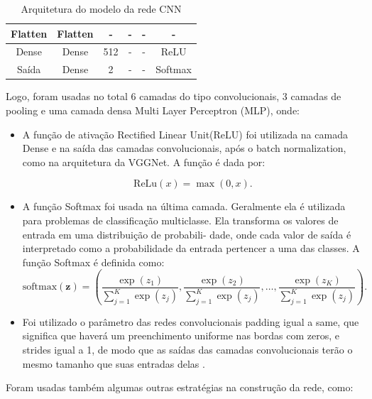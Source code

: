 \documentclass[]{abntex2}
\begin{document}
\begin{table}[H]
\begin{tabular}{|c|c|c|c|c|c|}
    \cellcolor[HTML]{C0C0C0}Flatten                          & Flatten       & -                    & -                 & -       & -           \\ \hline
    \cellcolor[HTML]{C0C0C0}Dense                            & Dense         & 512                  & -                 & -       & ReLU        \\ \hline
    \cellcolor[HTML]{C0C0C0}Saída                            & Dense         & 2                    & -                 & -       & Softmax     \\ \hline
    \end{tabular}
    \caption{Arquitetura do modelo da rede CNN}
    \label{tab:arquiCNN}

\end{table}

Logo, foram usadas no total 6 camadas do tipo convolucionais, 3 camadas de pooling e uma camada densa Multi Layer Perceptron (MLP), onde:

\begin{itemize}
    \item A função de ativação Rectified Linear Unit(ReLU) foi utilizada na camada Dense e na saída das camadas convolucionais, após o batch normalization, como na arquitetura da VGGNet. A função é dada por:
    
    \[
    \text{ReLu}(x) = \max(0, x).
    \]

    \item A função Softmax foi usada na última camada. Geralmente ela é utilizada para problemas de
    classificação multiclasse. Ela transforma os valores de entrada em uma distribuição de probabili-
    dade, onde cada valor de saída é interpretado como a probabilidade da entrada pertencer a uma
    das classes. A função Softmax é definida como:
    \[
        \text{softmax}(\mathbf{z}) = \left( \frac{\exp(z_1)}{\sum_{j=1}^{K} \exp(z_j)}, \frac{\exp(z_2)}{\sum_{j=1}^{K} \exp(z_j)}, \ldots, \frac{\exp(z_K)}{\sum_{j=1}^{K} \exp(z_j)} \right).
    \]
    
    \item Foi utilizado o parâmetro das redes convolucionais padding igual a same, que significa que haverá um preenchimento uniforme nas bordas com zeros, e strides igual a 1, de modo que as saídas das camadas convolucionais terão o mesmo tamanho que suas entradas delas \cite{keras}.
\end{itemize}

Foram usadas também algumas outras estratégias na construção da rede, como:
\end{document}
